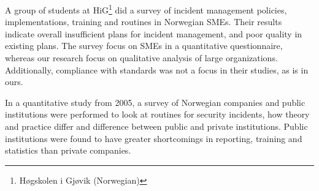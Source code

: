 A group of students at HiG\footnote{Høgskolen i Gjøvik (Norwegian)} did a survey of incident management policies, implementations, training and routines in Norwegian \acp{SME}. Their results indicate overall insufficient plans for incident management, and poor quality in existing plans. The survey focus on \acp{SME}  in a quantitative questionnaire, whereas our research focus on qualitative analysis of large organizations. Additionally, compliance with standards was not a focus in their studies, as is in ours.

In a quantitative study from 2005\cite{brage}, a survey of Norwegian companies and public institutions were performed to look at routines for security incidents, how theory and practice differ and difference between public and private institutions. Public institutions were found to have greater shortcomings in reporting, training and statistics than private companies. 